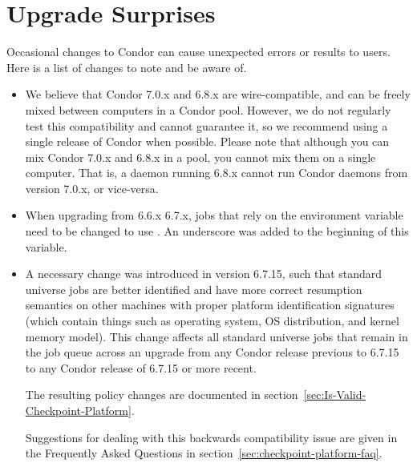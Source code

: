 \section{\label{sec:gotchas}Upgrade Surprises}

Occasional changes to Condor can cause unexpected errors or results
to users.
Here is a list of changes to note and be aware of.

\begin{itemize}

\item 
We believe that Condor 7.0.x and 6.8.x are wire-compatible,
and can be freely mixed between computers in a Condor pool. 
However, we do not regularly test this compatibility and cannot guarantee it, 
so we recommend using a single release of Condor when possible. 
Please note that although you can mix Condor 7.0.x and 6.8.x in a pool, 
you cannot mix them on a single computer. 
That is, a  daemon running 6.8.x cannot run Condor daemons 
from version 7.0.x, or vice-versa.

\item When upgrading from 6.6.x 6.7.x,
  jobs that rely on the environment variable 
  need to be changed to use .
  An underscore was added to the beginning of this variable.

\item A necessary change was introduced in version 6.7.15, such that
  standard universe jobs are better identified and have more
  correct resumption semantics on other machines with proper platform
  identification signatures (which contain things such as operating system,
  OS distribution, and kernel memory model). This change affects all
  standard universe jobs that remain in the job queue across an upgrade
  from any Condor release previous to 6.7.15 to any Condor release of
  6.7.15 or more recent.

  The resulting policy changes are documented in
  section~\ref{sec:Is-Valid-Checkpoint-Platform}.

  Suggestions for dealing with this backwards compatibility issue
  are given in the Frequently Asked Questions in
  section~\ref{sec:checkpoint-platform-faq}.


\end{itemize}

